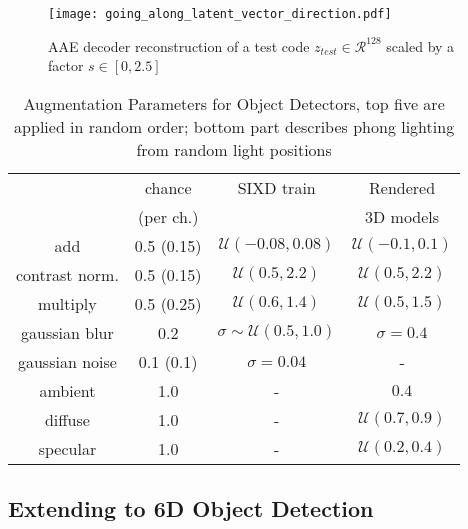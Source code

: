 \begin{figure}[t]\centering
		\captionsetup{width=0.99\columnwidth}
		\texttt{[image: going\_along\_latent\_vector\_direction.pdf]}
		\caption{\gls{AAE} decoder reconstruction of a test code $z_{test} \in \mathcal{R}^{128}$ scaled by a factor $s\in[0,2.5]$}
		\label{fig:scale}
\end{figure}
\begin{table}[t]
	\scriptsize
	\centering
	\captionsetup{width=0.9\columnwidth}
	\caption{Augmentation Parameters for Object Detectors, top five are applied in random order; bottom part describes phong lighting from random light positions}
	\begin{tabular}{cc|cc}
		\toprule
		&chance & SIXD train & Rendered \\
		&(per ch.)& & 3D models \\
		\midrule
		add & 0.5 (0.15) & $\mathcal{U}(-0.08,0.08)$  &$\mathcal{U}(-0.1,0.1)$ \\
		contrast norm. &0.5 (0.15)& $\mathcal{U}(0.5,2.2)$  &$\mathcal{U}(0.5,2.2)$\\
		multiply & 0.5 (0.25) & $\mathcal{U}(0.6,1.4)$ &$\mathcal{U}(0.5,1.5)$ \\
		gaussian blur & 0.2 & $\sigma \sim \mathcal{U}(0.5,1.0)$  & $\sigma = 0.4$ \\
		gaussian noise & 0.1 (0.1) & $\sigma = 0.04$ & - \\
		\midrule
		ambient & 1.0 & -&$0.4$ \\
		diffuse &1.0&-&$\mathcal{U}(0.7,0.9)$ \\
		specular &1.0&-&$\mathcal{U}(0.2,0.4)$ 
	\end{tabular}
	\label{tab:aug_det}
\end{table}
\subsection{Extending to 6D Object Detection}
